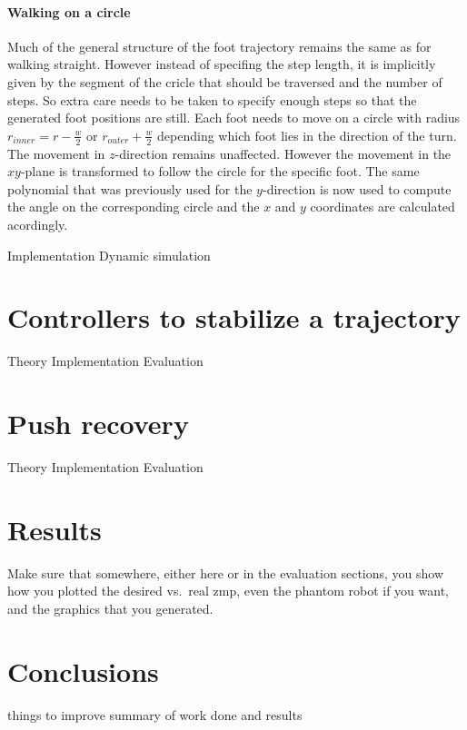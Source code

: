 \documentclass[english,ngerman]{KITreprt}
\newcommand{\clr}[2]{{\color{#1}{#2}}}
\newcommand{\todo}[1]{\marginpar{\clr{red}{#1}}}
\begin{document}
\subsubsection{Walking on a circle}\label{walking-on-a-circle}

Much of the general structure of the foot trajectory remains the same as
for walking straight. However instead of specifing the step length, it
is implicitly given by the segment of the cricle that should be
traversed and the number of steps. So extra care needs to be taken to
specify enough steps so that the generated foot positions are still.
Each foot needs to move on a circle with radius
$r_{inner} = r - \frac{w}{2}$ or $r_{outer} + \frac{w}{2}$ depending
which foot lies in the direction of the turn. The movement in
$z$-direction remains unaffected. However the movement in the $xy$-plane
is transformed to follow the circle for the specific foot.
\todo{Current implementation does effectively that, but is actually a hack. Needs seperate trajectories for left/right}
The same polynomial that was previously used for the $y$-direction is
now used to compute the angle on the corresponding circle and the $x$
and $y$ coordinates are calculated acordingly.

Implementation Dynamic simulation

\chapter{Controllers to stabilize a
trajectory}\label{controllers-to-stabilize-a-trajectory}

Theory Implementation Evaluation

\chapter{Push recovery}\label{push-recovery}

Theory Implementation Evaluation

\chapter{Results}\label{results}

Make sure that somewhere, either here or in the evaluation sections, you
show how you plotted the desired vs.~real zmp, even the phantom robot if
you want, and the graphics that you generated.

\chapter{Conclusions}\label{conclusions}

things to improve summary of work done and results



\end{document}
